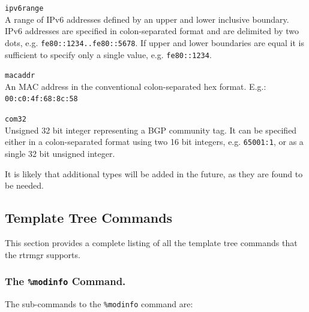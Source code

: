 \documentclass[11pt]{article}
\begin{document}
\begin{description}
  \item{\tt ipv6range}\\
  A range of IPv6 addresses defined by an upper and lower inclusive boundary.
  IPv6 addresses are specified in colon-separated format and are delimited
  by two dots, e.g. {\tt fe80::1234..fe80::5678}.
  If upper and lower boundaries are equal it is
  sufficient to specify only a single value, e.g. {\tt fe80::1234}.

  \item{\tt macaddr}\\
  An MAC address in the conventional colon-separated hex format.
  E.g.: {\tt 00:c0:4f:68:8c:58}

  \item{\tt com32}\\
  Unsigned 32 bit integer representing a BGP community tag.  It can be
  specified either in a colon-separated format using two 16 bit integers,
  e.g. {\tt 65001:1}, or as a single 32 bit unsigned integer.

\end{description}

It is likely that additional types will be added in the future, as
they are found to be needed.

\subsection{Template Tree Commands}
This section provides a complete listing of all the template tree
commands that the rtrmgr supports.

\subsubsection{The {\tt \%modinfo} Command.}

The sub-commands to the {\tt \%modinfo} command are:
\end{document}
